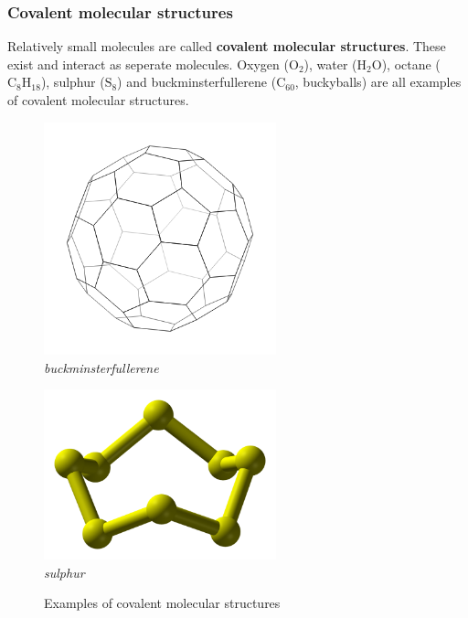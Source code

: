 \subsubsection*{Covalent molecular structures}
Relatively small molecules are called \textbf{covalent molecular structures}. These exist and interact as seperate molecules. Oxygen ($\text{O}_{2}$), water ($\text{H}_{2}\text{O}$), octane ($\text{C}_{8}\text{H}_{18}$), sulphur ($\text{S}_{8}$) and buckminsterfullerene ($\text{C}_{60}$, buckyballs) are all examples of covalent molecular structures. \\
\begin{figure}[H]
  \begin{center}
  \begin{minipage}[c]{5 cm}
    \includegraphics[width=0.6\textwidth]{photos/Buckyball_Carbon.png} \\
    \textsl{buckminsterfullerene}
  \end{minipage}
  \begin{minipage}[c]{5 cm}
    \includegraphics[width=0.6\textwidth]{photos/sulphur_wikipedia.png}  \\ 
    \textsl{sulphur}
  \end{minipage}
\caption{Examples of covalent molecular structures}
\end{center}
\end{figure}

